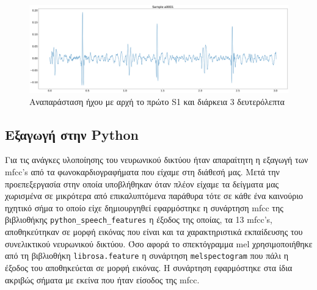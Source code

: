 \begin{figure}[H]
	\includegraphics[width=\textwidth]{../images/a0001.png}
	\caption{Αναπαράσταση ήχου με αρχή το πρώτο S1 και διάρκεια 3 δευτερόλεπτα}
	\label{a0001_sound}
\end{figure}


\subsection{Eξαγωγή στην Python}
Για τις ανάγκες υλοποίησης του νευρωνικού δικτύου ήταν απαραίτητη η εξαγωγή των
mfcc's από τα φωνοκαρδιογραφήματα  που είχαμε στη διάθεσή μας. Μετά την
προεπεξεργασία στην οποία υποβλήθηκαν όταν πλέον είχαμε τα δείγματα μας
χωρισμένα σε μικρότερα από επικαλυπτόμενα παράθυρα τότε σε κάθε ένα καινούριο
ηχητικό σήμα το οποίο είχε δημιουργηθεί εφαρμόστηκε η συνάρτηση mfcc της
βιβλιοθήκης \verb|python_speech_features| η έξοδος της οποίας, τα 13 mfcc's,
αποθηκεύτηκαν σε μορφή εικόνας που είναι και τα χαρακτηριστικά εκπαίδευσης  του
συνελικτικού νευρωνικού δικτύου. Όσο αφορά το σπεκτόγραμμα mel χρησιμοποιήθηκε
από τη βιβλιοθήκη \verb|librosa.feature| η συνάρτηση \verb|melspectogram| που
πάλι η έξοδος του αποθηκεύεται σε μορφή εικόνας. Η συνάρτηση εφαρμόστηκε στα
ίδια ακριβώς σήματα με εκείνα που ήταν είσοδος της mfcc.
